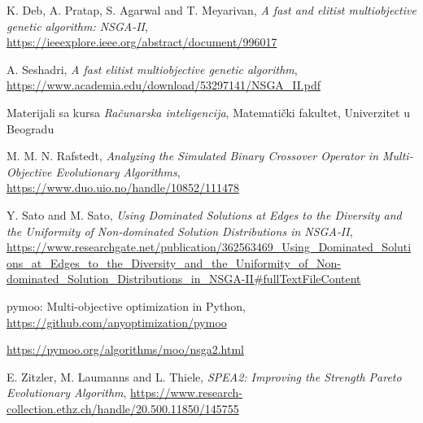 \documentclass[12pt]{article}
\begin{document}
\renewcommand{\refname}{Literatura}
\begin{thebibliography}{10}

 K. Deb, A. Pratap, S. Agarwal and T. Meyarivan, \textit{A fast and elitist multiobjective genetic algorithm: NSGA-II}, \url{https://ieeexplore.ieee.org/abstract/document/996017}

 A. Seshadri, \textit{A fast elitist multiobjective genetic algorithm}, \url{https://www.academia.edu/download/53297141/NSGA_II.pdf}

 Materijali sa kursa \textit{Računarska inteligencija}, Matematički fakultet, Univerzitet u Beogradu

 M. M. N. Rafstedt, \textit{Analyzing the Simulated Binary Crossover Operator in Multi-Objective Evolutionary Algorithms}, \url{https://www.duo.uio.no/handle/10852/111478}

 Y. Sato and M. Sato, \textit{Using Dominated Solutions at Edges to the Diversity and the Uniformity of Non‑dominated Solution Distributions in NSGA‑II}, \url{https://www.researchgate.net/publication/362563469_Using_Dominated_Solutions_at_Edges_to_the_Diversity_and_the_Uniformity_of_Non-dominated_Solution_Distributions_in_NSGA-II#fullTextFileContent}

 pymoo: Multi-objective optimization in Python, \url{https://github.com/anyoptimization/pymoo}

 \url{https://pymoo.org/algorithms/moo/nsga2.html}

 E. Zitzler, M. Laumanns and L. Thiele, \textit{SPEA2: Improving the Strength Pareto Evolutionary Algorithm}, \url{https://www.research-collection.ethz.ch/handle/20.500.11850/145755}



\end{thebibliography}
\end{document}
